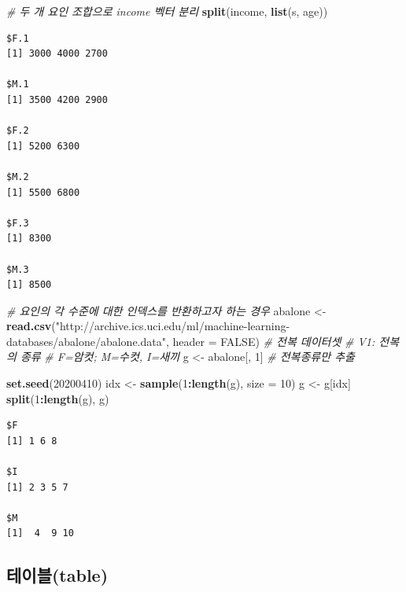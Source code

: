 \documentclass[
  11pt,
]{krantz}
\newenvironment{Shaded}{\begin{snugshade}}{\end{snugshade}}
\newcommand{\CommentTok}[1]{\textcolor[rgb]{0.37,0.37,0.37}{\textit{#1}}}
\newcommand{\DataTypeTok}[1]{\textcolor[rgb]{0.27,0.27,0.27}{#1}}
\newcommand{\DecValTok}[1]{\textcolor[rgb]{0.06,0.06,0.06}{#1}}
\newcommand{\KeywordTok}[1]{\textcolor[rgb]{0.27,0.27,0.27}{\textbf{#1}}}
\newcommand{\NormalTok}[1]{#1}
\newcommand{\OperatorTok}[1]{\textcolor[rgb]{0.43,0.43,0.43}{\textbf{#1}}}
\newcommand{\OtherTok}[1]{\textcolor[rgb]{0.37,0.37,0.37}{#1}}
\newcommand{\StringTok}[1]{\textcolor[rgb]{0.5,0.5,0.5}{#1}}
\begin{document}
\begin{Shaded}
\begin{Highlighting}[]
\CommentTok{# 두 개 요인 조합으로 income 벡터 분리 }
\KeywordTok{split}\NormalTok{(income, }\KeywordTok{list}\NormalTok{(s, age))}
\end{Highlighting}
\end{Shaded}

\begin{verbatim}
$F.1
[1] 3000 4000 2700

$M.1
[1] 3500 4200 2900

$F.2
[1] 5200 6300

$M.2
[1] 5500 6800

$F.3
[1] 8300

$M.3
[1] 8500
\end{verbatim}

\begin{Shaded}
\begin{Highlighting}[]
\CommentTok{# 요인의 각 수준에 대한 인덱스를 반환하고자 하는 경우}
\NormalTok{abalone <-}\StringTok{ }\KeywordTok{read.csv}\NormalTok{(}\StringTok{"http://archive.ics.uci.edu/ml/machine-learning-databases/abalone/abalone.data"}\NormalTok{, }
    \DataTypeTok{header =} \OtherTok{FALSE}\NormalTok{) }\CommentTok{# 전복 데이터셋}
\CommentTok{# V1: 전복의 종류}
\CommentTok{# F=암컷; M=수컷, I=새끼}
\NormalTok{g <-}\StringTok{ }\NormalTok{abalone[, }\DecValTok{1}\NormalTok{] }\CommentTok{# 전복종류만 추출}

\KeywordTok{set.seed}\NormalTok{(}\DecValTok{20200410}\NormalTok{)}
\NormalTok{idx <-}\StringTok{ }\KeywordTok{sample}\NormalTok{(}\DecValTok{1}\OperatorTok{:}\KeywordTok{length}\NormalTok{(g), }\DataTypeTok{size =} \DecValTok{10}\NormalTok{)}
\NormalTok{g <-}\StringTok{ }\NormalTok{g[idx]}
\KeywordTok{split}\NormalTok{(}\DecValTok{1}\OperatorTok{:}\KeywordTok{length}\NormalTok{(g), g)}
\end{Highlighting}
\end{Shaded}

\begin{verbatim}
$F
[1] 1 6 8

$I
[1] 2 3 5 7

$M
[1]  4  9 10
\end{verbatim}

\normalsize

\hypertarget{table}{%
\subsection{테이블(table)}\label{table}}
\end{document}
